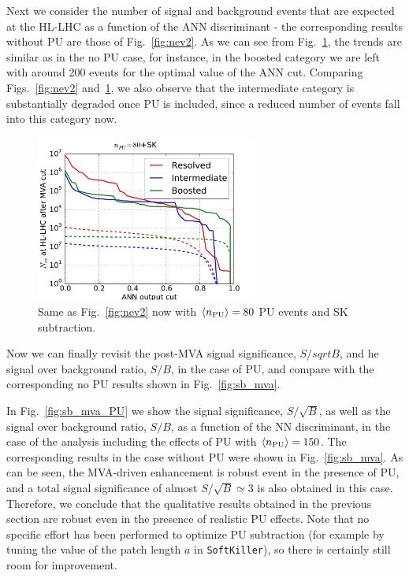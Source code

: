 Next we consider the number of signal and background events that
are expected at the HL-LHC as a function of the ANN discriminant -
the corresponding results without PU are those of
Fig.~\ref{fig:nev2}.
%
As we can see from Fig.~\ref{fig:nev2_PU}, the trends are
similar as in the no PU case, for instance, in the boosted
category we are left with around 200 events for the optimal value
of the ANN cut.
%
Comparing Figs.~\ref{fig:nev2} and~\ref{fig:nev2_PU}, we also observe
that the intermediate category is substantially degraded once PU
is included, since a reduced number of events fall into this
category now.

\begin{figure}[t]
\begin{center}
\includegraphics[width=0.65\textwidth]{plots/nev2_SKPU80.pdf}
\caption{\small Same as Fig.~\ref{fig:nev2} now
  with  $\left\langle n_{\rm PU}\right\rangle=80$ PU events 
  and SK subtraction.
}
\label{fig:nev2_PU}
\end{center}
\end{figure}

Now we can finally revisit the post-MVA signal significance,
$S/sqrt{B}$, and he signal over background ratio, $S/B$,
in the case of PU, and compare with the corresponding
no PU results shown in Fig.~\ref{fig:sb_mva}.
%

In Fig.~\ref{fig:sb_mva_PU} we show the signal significance,
$S/\sqrt{B}$, as well as the signal over background ratio,
$S/B$, as a function of the NN discriminant, in the case
of the analysis including the effects of PU
with $\left\langle n_{\rm PU}\right\rangle=150$.
%
The corresponding results in the case without PU were shown in
Fig.~\ref{fig:sb_mva}.
%
As can be seen, the MVA-driven enhancement is robust event in the
presence of PU, and a total signal significance of
almost $S/\sqrt{B}\simeq 3$ is also obtained in this case.
%
Therefore, we conclude that the qualitative results obtained
in the previous section are robust even in the presence
of realistic PU effects.
%
Note that no specific effort has been performed to
optimize PU subtraction (for example by tuning the value
of the patch length $a$ in {\tt SoftKiller}), so there is
certainly still room for improvement.


